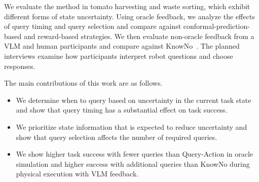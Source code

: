 We evaluate the method in tomato harvesting and waste sorting, which exhibit different forms of state uncertainty. Using oracle feedback, we analyze the effects of query timing and query selection and compare against conformal-prediction-based and reward-based strategies. We then evaluate non-oracle feedback from a VLM and human participants and compare against KnowNo~\cite{ren2023robots}. The planned interviews examine how participants interpret robot questions and choose responses.


The main contributions of this work are as follows.

\begin{itemize}

\item We determine when to query based on uncertainty in the current task state and show that query timing has a substantial effect on task success.

\item We prioritize state information that is expected to reduce uncertainty and show that query selection affects the number of required queries.

\item We show higher task success with fewer queries than Query-Action in oracle simulation and higher success with additional queries than KnowNo during physical execution with VLM feedback.

\end{itemize}
